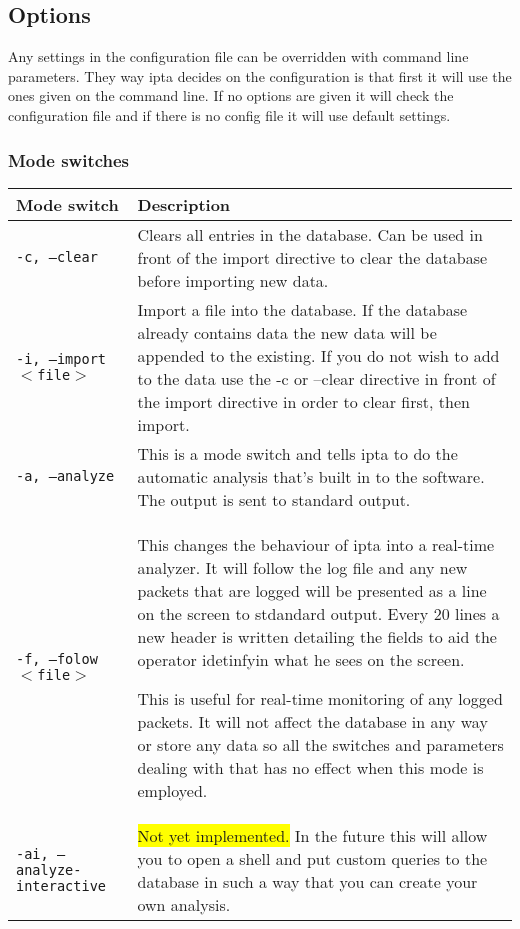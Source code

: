 \documentclass[english,twoside,openright,a4paper,12pt]{article}
\newcommand{\hilight}[1]{\colorbox{yellow}{#1}}
\begin{document}
\subsection{Options}

Any settings in the configuration file can be overridden with command
line parameters. They way ipta decides on the configuration is that
first it will use the ones given on the command line. If no options
are given it will check the configuration file and if there is no
config file it will use default settings.


\subsubsection{Mode switches}
\scriptsize
\begin{longtable}{|p{}|p{}|}
\hline
\textbf{Mode switch}& \textbf{Description}\\\hline

\texttt{-c, --clear} & 

Clears all entries in the database. Can be used in front of the import
directive to clear the database before importing new data.\\\hline

\texttt{-i, --import $<$file$>$} & 

Import a file into the database. If the database already contains data
the new data will be appended to the existing. If you do not wish to
add to the data use the -c or --clear directive in front of the import
directive in order to clear first, then import.\\\hline

\texttt{-a, --analyze} &  

This is a mode switch and tells ipta to do the automatic analysis
that's built in to the software. The output is sent to standard
output. \\\hline

\texttt{-f, --folow $<$file$>$} & 

This changes the behaviour of ipta into a real-time analyzer. It will
follow the log file and any new packets that are logged will be
presented as a line on the screen to stdandard output. Every 20 lines
a new header is written detailing the fields to aid the operator
idetinfyin what he sees on the screen.

This is useful for real-time monitoring of any logged packets. It will
not affect the database in any way or store any data so all the
switches and parameters dealing with that has no effect when this mode
is employed.\\\hline

\texttt{-ai, --analyze-interactive} & \hilight{Not yet implemented.}
In the future this will allow you to open a shell and put custom
queries to the database in such a way that you can create your own
analysis.\\\hline

\end{longtable}
\end{document}
